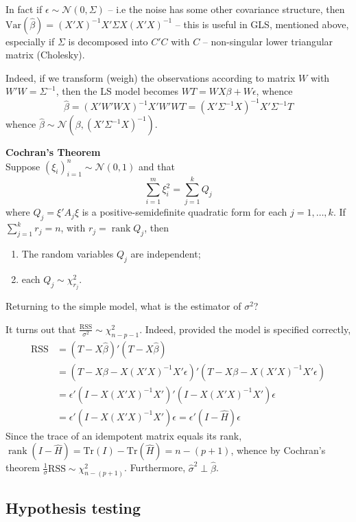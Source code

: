 \documentclass[a4paper]{article}
\newcommand{\brac}[1]{{\left ( #1 \right )}}
\newcommand{\Ncal}{\mathcal{N}}
\newcommand{\Var}[0]{{\text{Var}}}
\newcommand{\RSS}{{\text{RSS}}}
\newcommand{\TR}{{\text{Tr}}}
\newcommand{\rank}{\mathop{\text{rank}}\nolimits}
\begin{document}
In fact if $\epsilon\sim \Ncal\brac{0,\Sigma}$ -- i.e the noise has some other covariance structure, then $\Var(\hat{\beta}) = \brac{X'X}^{-1}X'\Sigma X\brac{X'X}^{-1}$ -- this is useful in GLS, mentioned above, especially if $\Sigma$ is decomposed into $C'C$ with $C$ -- non-singular lower triangular matrix (Cholesky).

Indeed, if we transform (weigh) the observations according to matrix $W$ with $W'W = \Sigma^{-1}$, then the LS model becomes $WT=WX\beta + W\epsilon$, whence
\[\hat{\beta} = \brac{X'W'WX}^{-1}X'W'WT = \brac{X'\Sigma^{-1}X}^{-1}X'\Sigma^{-1}T\]
whence $\hat{\beta}\sim\Ncal\brac{\beta, \brac{X'\Sigma^{-1}X}^{-1}}$.

\noindent\textbf{Cochran's Theorem} \hfill\\
Suppose $\brac{\xi_i}_{i=1}^n \sim\Ncal(0, 1)$ and that
\[\sum_{i=1}^m \xi_i^2 = \sum_{j=1}^k Q_j\]
where $Q_j = \xi' A_j \xi$ is a positive-semidefinite quadratic form for each $j=1,\ldots,k$.
If $\sum_{j=1}^k r_j = n$, with $r_j = \rank{Q_j}$, then \begin{enumerate}
	\item The random variables $Q_j$ are independent;
	\item each $Q_j\sim \chi^2_{r_j}$.
\end{enumerate}

Returning to the simple model, what is the estimator of $\sigma^2$?

It turns out that $\frac{\RSS}{\sigma^2}\sim \chi^2_{n-p-1}$.
Indeed, provided the model is specified correctly, \begin{align*}
	\RSS &= \brac{T-X\hat{\beta}}'\brac{T-X\hat{\beta}} \\
	& = \brac{T-X\beta - X\brac{X'X}^{-1}X'\epsilon}'\brac{T-X\beta - X\brac{X'X}^{-1}X'\epsilon} \\
	& = \epsilon' \brac{I - X\brac{X'X}^{-1}X'}'\brac{I - X\brac{X'X}^{-1}X'}\epsilon \\
	& = \epsilon' \brac{ I - X\brac{X'X}^{-1}X' } \epsilon = \epsilon' \brac{ I - \hat{H} } \epsilon
\end{align*}
Since the trace of an idempotent matrix equals its rank, $\rank(I - \hat{H}) = \TR(I) - \TR(\hat{H}) = n- (p+1)$, whence by Cochran's theorem $\frac{1}{\sigma}\RSS\sim\chi^2_{n-(p+1)}$.
Furthermore, $\hat{\sigma}^2 \perp \hat{\beta}$.

\subsection{Hypothesis testing} %
\label{sub:hypothesis_testing}
\end{document}
